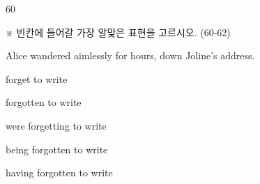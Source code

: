 \begin{question}{60}
\begin{framedtext}
※ 빈칸에 들어갈 가장 알맞은 표현을 고르시오. (60-62) \par
\end{framedtext}
Alice wandered aimlessly for hours, \blank{} down Joline's address.
\begin{choices}
  \item forget to write
  \item forgotten to write
  \item were forgetting to write
  \item being forgotten to write
  \item having forgotten to write
\end{choices}
\end{question}
